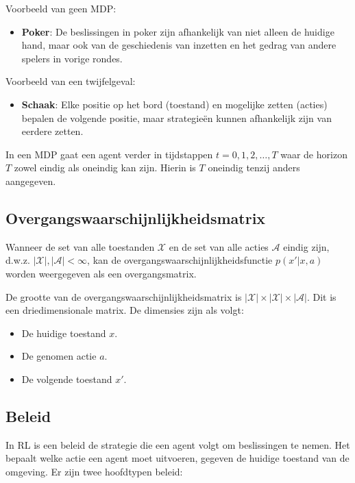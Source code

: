 \documentclass[a4paper,12pt]{report}
\begin{document}
Voorbeeld van geen MDP:
\begin{itemize}
    \item \textbf{Poker}: De beslissingen in poker zijn afhankelijk van niet alleen de huidige hand, maar ook van de geschiedenis van inzetten en het gedrag van andere spelers in vorige rondes.
\end{itemize}

Voorbeeld van een twijfelgeval:
\begin{itemize}
    \item \textbf{Schaak}: Elke positie op het bord (toestand) en mogelijke zetten (acties) bepalen de volgende positie, maar strategieën kunnen afhankelijk zijn van eerdere zetten.
\end{itemize}

In een MDP gaat een agent verder in tijdstappen \(t = 0, 1, 2, \ldots, T\) waar
de horizon \(T\) zowel eindig als oneindig kan zijn. Hierin is \(T\) oneindig
tenzij anders aangegeven.

\subsection*{Overgangswaarschijnlijkheidsmatrix}

Wanneer de set van alle toestanden \(\mathcal{X}\) en de set van alle acties
\(\mathcal{A}\) eindig zijn, d.w.z. \(|\mathcal{X}|, |\mathcal{A}| < \infty\),
kan de overgangswaarschijnlijkheidsfunctie \(p(x'|x,a)\) worden weergegeven als
een overgangsmatrix.

De grootte van de overgangswaarschijnlijkheidsmatrix is \(|\mathcal{X}| \times
|\mathcal{X}| \times |\mathcal{A}|\). Dit is een driedimensionale matrix. De
dimensies zijn als volgt:
\begin{itemize}
    \item De huidige toestand \(x\).
    \item De genomen actie \(a\).
    \item De volgende toestand \(x'\).
\end{itemize}

\subsection*{Beleid}

In RL is een beleid de strategie die een agent volgt om beslissingen te nemen.
Het bepaalt welke actie een agent moet uitvoeren, gegeven de huidige toestand
van de omgeving. Er zijn twee hoofdtypen beleid:
\end{document}
